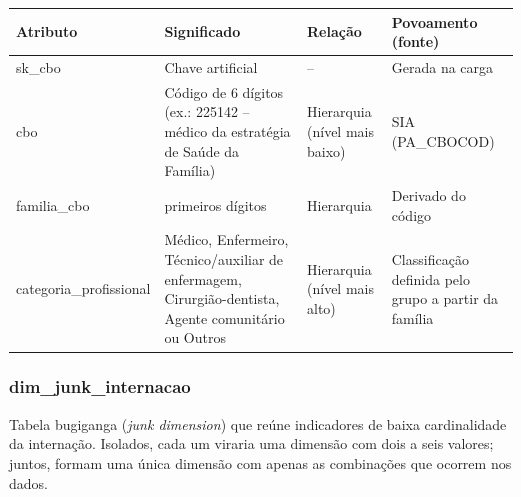 \documentclass[12pt,a4paper]{article}
\begin{document}
{\small{}\begin{longtable}{|>{\raggedright\arraybackslash}p{}|>{\raggedright\arraybackslash}p{}|>{\raggedright\arraybackslash}p{}|>{\raggedright\arraybackslash}p{}|}\hline\rowcolor{azul}\color{white}\bfseries Atributo & \color{white}\bfseries Significado & \color{white}\bfseries Relação & \color{white}\bfseries Povoamento (fonte) \\ \hline\endhead
sk\_\allowbreak{}cbo & Chave artificial & – & Gerada na carga \\ \hline
cbo & Código de 6 dígitos (ex.: 225142 – médico da estratégia de Saúde da Família) & Hierarquia (nível mais baixo) & SIA (PA\_\allowbreak{}CBOCOD) \\ \hline
familia\_\allowbreak{}cbo & 4 primeiros dígitos & Hierarquia & Derivado do código \\ \hline
categoria\_\allowbreak{}profissional & Médico, Enfermeiro, Técnico/auxiliar de enfermagem, Cirurgião-dentista, Agente comunitário ou Outros & Hierarquia (nível mais alto) & Classificação definida pelo grupo a partir da família \\ \hline\end{longtable}}

\subsubsection*{dim\_\allowbreak{}junk\_\allowbreak{}internacao}

Tabela bugiganga (\textit{junk dimension}) que reúne indicadores de baixa cardinalidade da internação. Isolados, cada um viraria uma dimensão com dois a seis valores; juntos, formam uma única dimensão com apenas as combinações que ocorrem nos dados.
\end{document}

